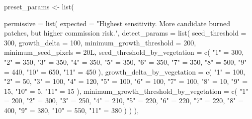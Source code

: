 \documentclass[
  british,
  a4paper,
]{scrbook}
\newenvironment{Shaded}{\begin{snugshade}}{\end{snugshade}}
\newcommand{\AttributeTok}[1]{\textcolor[rgb]{0.40,0.45,0.13}{#1}}
\newcommand{\DecValTok}[1]{\textcolor[rgb]{0.68,0.00,0.00}{#1}}
\newcommand{\FunctionTok}[1]{\textcolor[rgb]{0.28,0.35,0.67}{#1}}
\newcommand{\NormalTok}[1]{\textcolor[rgb]{0.00,0.23,0.31}{#1}}
\newcommand{\OtherTok}[1]{\textcolor[rgb]{0.00,0.23,0.31}{#1}}
\newcommand{\StringTok}[1]{\textcolor[rgb]{0.13,0.47,0.30}{#1}}
\begin{document}
\begin{Shaded}
\begin{Highlighting}[]
\NormalTok{preset\_params }\OtherTok{\textless{}{-}} \FunctionTok{list}\NormalTok{(}

  \AttributeTok{permissive =} \FunctionTok{list}\NormalTok{(}
    \AttributeTok{expected =} \StringTok{"Highest sensitivity. More candidate burned patches, but higher commission risk."}\NormalTok{,}
    \AttributeTok{detect\_params =} \FunctionTok{list}\NormalTok{(}
      \AttributeTok{seed\_threshold =} \DecValTok{300}\NormalTok{,}
      \AttributeTok{growth\_delta =} \DecValTok{100}\NormalTok{,}
      \AttributeTok{minimum\_growth\_threshold =} \DecValTok{200}\NormalTok{,}
      \AttributeTok{minimum\_seed\_pixels =} \DecValTok{20}\NormalTok{L,}
      \AttributeTok{seed\_threshold\_by\_vegetation =} \FunctionTok{c}\NormalTok{(}
        \StringTok{"1"} \OtherTok{=} \DecValTok{300}\NormalTok{, }\StringTok{"2"} \OtherTok{=} \DecValTok{350}\NormalTok{, }\StringTok{"3"} \OtherTok{=} \DecValTok{350}\NormalTok{, }\StringTok{"4"} \OtherTok{=} \DecValTok{350}\NormalTok{, }\StringTok{"5"} \OtherTok{=} \DecValTok{350}\NormalTok{,}
        \StringTok{"6"} \OtherTok{=} \DecValTok{350}\NormalTok{, }\StringTok{"7"} \OtherTok{=} \DecValTok{350}\NormalTok{, }\StringTok{"8"} \OtherTok{=} \DecValTok{500}\NormalTok{, }\StringTok{"9"} \OtherTok{=} \DecValTok{440}\NormalTok{, }\StringTok{"10"} \OtherTok{=} \DecValTok{650}\NormalTok{, }\StringTok{"11"} \OtherTok{=} \DecValTok{450}
\NormalTok{      ),}
      \AttributeTok{growth\_delta\_by\_vegetation =} \FunctionTok{c}\NormalTok{(}
        \StringTok{"1"} \OtherTok{=} \DecValTok{100}\NormalTok{, }\StringTok{"2"} \OtherTok{=} \DecValTok{50}\NormalTok{, }\StringTok{"3"} \OtherTok{=} \DecValTok{100}\NormalTok{, }\StringTok{"4"} \OtherTok{=} \DecValTok{120}\NormalTok{, }\StringTok{"5"} \OtherTok{=} \DecValTok{100}\NormalTok{,}
        \StringTok{"6"} \OtherTok{=} \DecValTok{100}\NormalTok{, }\StringTok{"7"} \OtherTok{=} \DecValTok{100}\NormalTok{, }\StringTok{"8"} \OtherTok{=} \DecValTok{10}\NormalTok{, }\StringTok{"9"} \OtherTok{=} \DecValTok{15}\NormalTok{, }\StringTok{"10"} \OtherTok{=} \DecValTok{5}\NormalTok{, }\StringTok{"11"} \OtherTok{=} \DecValTok{15}
\NormalTok{      ),}
      \AttributeTok{minimum\_growth\_threshold\_by\_vegetation =} \FunctionTok{c}\NormalTok{(}
        \StringTok{"1"} \OtherTok{=} \DecValTok{200}\NormalTok{, }\StringTok{"2"} \OtherTok{=} \DecValTok{300}\NormalTok{, }\StringTok{"3"} \OtherTok{=} \DecValTok{250}\NormalTok{, }\StringTok{"4"} \OtherTok{=} \DecValTok{210}\NormalTok{, }\StringTok{"5"} \OtherTok{=} \DecValTok{220}\NormalTok{,}
        \StringTok{"6"} \OtherTok{=} \DecValTok{220}\NormalTok{, }\StringTok{"7"} \OtherTok{=} \DecValTok{220}\NormalTok{, }\StringTok{"8"} \OtherTok{=} \DecValTok{400}\NormalTok{, }\StringTok{"9"} \OtherTok{=} \DecValTok{380}\NormalTok{, }\StringTok{"10"} \OtherTok{=} \DecValTok{550}\NormalTok{, }\StringTok{"11"} \OtherTok{=} \DecValTok{380}
\NormalTok{      )}
\NormalTok{    )}
\NormalTok{  ),}


\end{Highlighting}
\end{Shaded}
\end{document}

